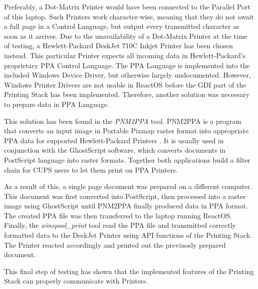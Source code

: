 Preferably, a Dot-Matrix Printer would have been connected to the Parallel Port of this laptop.
Such Printers work character-wise, meaning that they do not await a full page in a Control Language, but output every transmitted character as soon as it arrives.
Due to the unavailability of a Dot-Matrix Printer at the time of testing, a Hewlett-Packard DeskJet 710C Inkjet Printer has been chosen instead.
This particular Printer expects all incoming data in Hewlett-Packard's proprietary \gls{PPA} Control Language.
The \gls{PPA} Language is implemented into the included Windows Device Driver, but otherwise largely undocumented.
However, Windows Printer Drivers are not usable in ReactOS before the \gls{GDI} part of the Printing Stack has been implemented.
Therefore, another solution was necessary to prepare data in \gls{PPA} Language.

This solution has been found in the \emph{PNM2PPA} tool.
PNM2PPA is a program that converts an input image in Portable Pixmap raster format into appropriate \gls{PPA} data for supported Hewlett-Packard Printers \cite{pnm2ppa2015}.
It is usually used in conjunction with the GhostScript software, which converts documents in PostScript language into raster formats.
Together both applications build a filter chain for \gls{CUPS} users to let them print on \gls{PPA} Printers.

As a result of this, a single page document was prepared on a different computer.
This document was first converted into PostScript, then processed into a raster image using GhostScript until PNM2PPA finally produced data in \gls{PPA} format.
The created \gls{PPA} file was then transferred to the laptop running ReactOS.
Finally, the \emph{winspool\_print} tool read the \gls{PPA} file and transmitted correctly formatted data to the DeskJet Printer using \gls{API} functions of the Printing Stack.
The Printer reacted accordingly and printed out the previuosly prepared document.

This final step of testing has shown that the implemented features of the Printing Stack can properly communicate with Printers.
